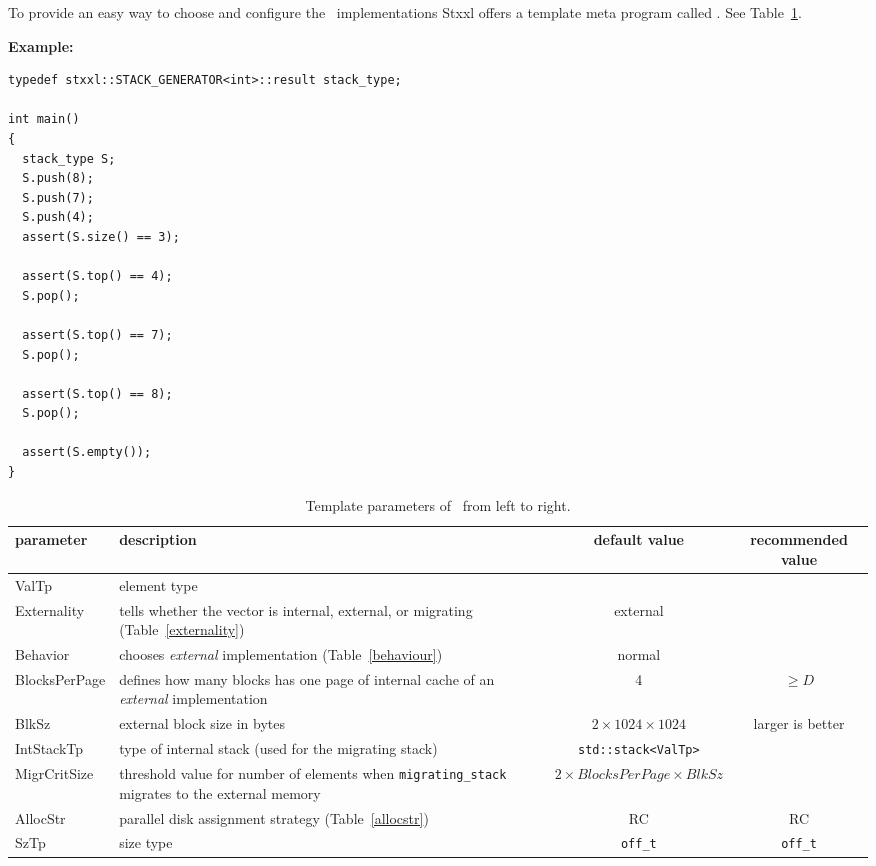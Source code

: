\documentclass[twoside]{book}
\newcommand{\stxxl}{{\sc Stxxl} }
\begin{document}
To provide an easy way to choose and configure the \xstack\
implementations \stxxl offers a template meta program called
\xstackg. See Table~\ref{stackparam}.

{\bf Example:}
\begin{lstlisting}
typedef stxxl::STACK_GENERATOR<int>::result stack_type;

int main()
{
  stack_type S;
  S.push(8);
  S.push(7);
  S.push(4);
  assert(S.size() == 3);

  assert(S.top() == 4);
  S.pop();

  assert(S.top() == 7);
  S.pop();

  assert(S.top() == 8);
  S.pop();

  assert(S.empty());
}

\end{lstlisting}

\begin{table}[h]
\begin{center}
\caption{Template parameters of \xstackg\ from left to right.}
\label{stackparam}
\begin{tabular}{|l|p{4.5cm}|c|c|}
\hline
parameter& description  & default value & recommended value \\
\hline\hline
ValTp       & element type & & \\
\hline
Externality & tells whether the vector is internal, external, or
migrating (Table~\ref{externality}) & external & \\
\hline
Behavior & chooses \emph{external} implementation
(Table~\ref{behaviour})& normal & \\ 
\hline
BlocksPerPage & defines how many blocks has one page of internal cache
of an \emph{external} implementation & 4 &  $\geq D$ \\
\hline
BlkSz & external block size in bytes &  $2\times 1024\times 1024$ &
larger is better\\
\hline
IntStackTp & type of internal stack (used for the migrating stack) &  
\texttt{std::stack<ValTp>} &\\
\hline
MigrCritSize & threshold value for number of elements when
\texttt{migrating\_stack} migrates to the external memory & 
$2\times BlocksPerPage\times BlkSz$ & \\
\hline
AllocStr &  parallel disk assignment strategy 
(Table~\ref{allocstr}) & RC & RC \\
\hline
SzTp & size type & \texttt{off\_t} & \texttt{off\_t} \\
\hline
\end{tabular}
\end{center}
\end{table}
\end{document}
